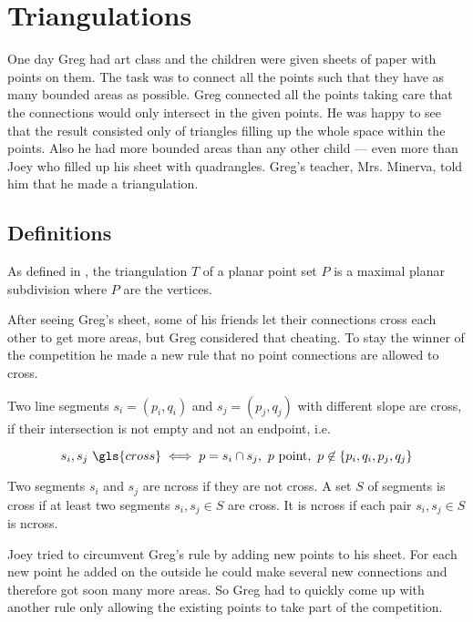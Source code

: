 \chapter{Triangulations}
One day Greg had art class and the children were given sheets of
paper with points on them. The task was to connect all the points 
such that they have as many bounded areas as possible. Greg 
connected all the points taking care that the connections would only 
intersect in the given points. He was happy to see that the result 
consisted only of triangles filling up the whole space within the 
points. Also he had more bounded areas than any other child --- 
even more than Joey who filled up his sheet with quadrangles. Greg's
teacher, Mrs. Minerva, told him that he made a triangulation.

\section{Definitions}
\begin{definition}[Triangulation]\label{def:triangulation_subdivision}
As defined in \cite[Section 9.1]{deberg_compgeom}, the
triangulation \(T\) of a planar point set \(P\) is a maximal planar 
subdivision where \(P\) are the vertices.
\end{definition}

After seeing Greg's sheet, some of his friends let their connections
cross each other to get more areas, but Greg considered that
cheating. To stay the winner of the competition he made a new rule
that no point connections are allowed to cross.

\begin{definition}[Crossing]\label{def:crossing}
Two line segments \(s_i=(p_i,q_i)\) and \(s_j=(p_j,q_j)\) with 
different slope are \gls{cross}, if their intersection is not empty
and not an endpoint, i.e.

\[
  s_i, s_j~\gls{cross}
  \iff
  p = s_i\cap s_j,~
  p~\text{point},~
  p \not\in \{p_i,q_i,p_j,q_j\} \]

Two segments \(s_i\) and \(s_j\) are \gls{ncross} if they are
not \gls{cross}. A set \(S\) of segments is \gls{cross} if at least
two segments \(s_i, s_j \in S\) are \gls{cross}. It is \gls{ncross}
if each pair \(s_i, s_j \in S\) is \gls{ncross}.
\end{definition}

Joey tried to circumvent Greg's rule by adding new points to his
sheet. For each new point he added on the outside he could make
several new connections and therefore got soon many more areas. So
Greg had to quickly come up with another rule only allowing the
existing points to take part of the competition.

